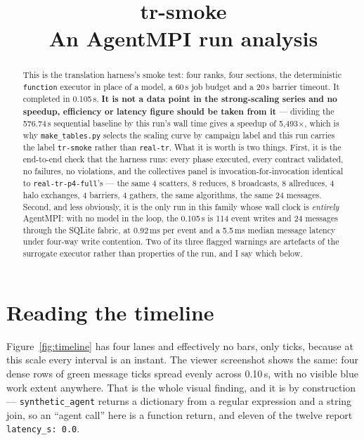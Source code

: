\documentclass[11pt]{article}
\title{\textbf{tr-smoke}\\[2pt]\large An AgentMPI run analysis}
\author{}
\date{}
\begin{document}
\maketitle

\begin{abstract}
This is the translation harness's smoke test: four ranks, four sections, the deterministic
\texttt{function} executor in place of a model, a 60\,s job budget and a 20\,s barrier timeout. It
completed in 0.105\,s. \textbf{It is not a data point in the strong-scaling series and no speedup,
efficiency or latency figure should be taken from it} --- dividing the 576.74\,s sequential
baseline by this run's wall time gives a speedup of 5{,}493$\times$, which is why
\texttt{make\_tables.py} selects the scaling curve by campaign label and this run carries the
label \texttt{tr-smoke} rather than \texttt{real-tr}. What it is worth is two things. First, it is
the end-to-end check that the harness runs: every phase executed, every contract validated, no
failures, no violations, and the collectives panel is invocation-for-invocation identical to
\texttt{real-tr-p4-full}'s --- the same 4 scatters, 8 reduces, 8 broadcasts, 8 allreduces, 4 halo
exchanges, 4 barriers, 4 gathers, the same algorithms, the same 24 messages. Second, and less
obviously, it is the only run in this family whose wall clock is \emph{entirely} AgentMPI: with no
model in the loop, the 0.105\,s is 114 event writes and 24 messages through the SQLite fabric, at
0.92\,ms per event and a 5.5\,ms median message latency under four-way write contention. Two of
its three flagged warnings are artefacts of the surrogate executor rather than properties of the
run, and I say which below.
\end{abstract}



\section{Reading the timeline}

Figure~\ref{fig:timeline} has four lanes and effectively no bars, only ticks, because at this
scale every interval is an instant. The viewer screenshot shows the same: four dense rows of green
message ticks spread evenly across 0.10\,s, with no visible blue work extent anywhere. That is the
whole visual finding, and it is by construction --- \texttt{synthetic\_agent} returns a
dictionary from a regular expression and a string join, so an ``agent call'' here is a function
return, and eleven of the twelve report \texttt{latency\_s: 0.0}.
\end{document}
